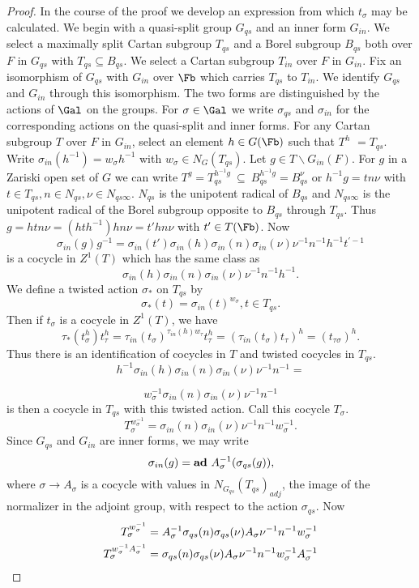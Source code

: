 \documentclass{memo-l}
\theoremstyle{definition}
\theoremstyle{remark}
\numberwithin{section}{chapter}
\numberwithin{equation}{chapter}
\begin{document}
\begin{proof}     In the course of the proof we develop an expression
from which $t_{{\sigma}}$ may be calculated.
 We begin with a quasi-split group $G_{qs}$ and an inner form $G_{in}$.
 We select a maximally split Cartan subgroup $T_{qs}$ and a Borel subgroup
$B_{qs}$ both over $F$ in $G_{qs}$ with $T_{qs} {\subseteq} {B_{qs}}$.
 We select a Cartan subgroup $T_{in}$ over $F$ in $G_{in}$.
 Fix an isomorphism of $G_{qs}$ with $G_{in}$ over $\Fb$  which
carries $T_{qs}$ to $T_{in}$.
 We identify $G_{qs}$ and $G_{in}$ through this isomorphism.
 The two forms are distinguished by the actions of $\Gal$ on the
groups.
 For ${\sigma} \in \Gal$ we write ${\sigma}_{qs}$ and
${\sigma}_{in}$ for the corresponding actions on the quasi-split and inner
forms.
  For any Cartan subgroup $T$ over $F$ in $G_{in}$, select an element $h \in
G(\Fb)$ such that $T^{h}$
$= T_{qs}$.
 Write ${\sigma}_{in}(h^{-1}) = w_{{\sigma}}h^{-1}$ with $w_{{\sigma}} \in
N_{G}(T_{qs})$.
 Let $g \in T\backslash G_{in}(F)$.
 For $g$ in a Zariski open set of $G$ we can write $T^g
= T_{qs}^{h^{-1}g}\ {\subseteq}\ B_{qs}^{h^{-1}g}  =
B_{qs}^\nu$  or $h^{-1}g = tn{\nu}$ with $t \in T_{qs},
n \in N_{qs}, {\nu} \in N_{qs{\infty}}$.
 $N_{qs}$ is the unipotent radical of $B_{qs}$ and $N_{qs{\infty}}$ is the
unipotent radical of the Borel subgroup opposite to $B_{qs}$ through $T_{qs}$.
 Thus $g = htn{\nu} = (hth^{-1})hn{\nu} = t'hn{\nu}$ with $t' \in
T(\Fb)$.
 Now
$$
\sigma_{in}(g)g^{-1} = {\sigma}_{in}(t'){\sigma}_{in}(h){\sigma}_{in}(n)
{\sigma}_{in}({\nu}){\nu}^{-1}n^{-1}h^{-1}t^{\prime-1}
$$
is a cocycle in $Z^{1}(T)$ which has the same class as
$$
{\sigma}_{in}(h){\sigma}_{in}(n){\sigma}_{in}({\nu}){\nu}^{-1}n^{-1}h^{-1} .
$$
We define a twisted action ${\sigma}_{*}$ on $T_{qs}$ by
$$
{\sigma}_{*}(t) = {\sigma}_{in}(t)^{w_{{\sigma}}}, t \in T_{qs} .
$$
Then if $t_{{\sigma}}$ is a cocycle in $Z^1(T)$, we have
$$
\tau_{*}(t_{{\sigma}}^{h})t_{{\tau}}^{h} =
{\tau}_{in}(t_{{\sigma}})^{\tau_{in}(h)w_{\tau}} t_{{\tau}}^{h} =
({\tau}_{in}(t_{{\sigma}})t_{{\tau}})^{h} = (t_{{\tau}{\sigma}})^{h}.
$$
Thus there is an identification of cocycles in $T$ and twisted cocycles in
$T_{qs}$.
$$
h^{-1}{\sigma}_{in}(h){\sigma}_{in}(n){\sigma}_{in}({\nu}){\nu}^{-1}n^{-1} =
$$

$$
w_{{\sigma}}^{-1}{\sigma}_{in}(n){\sigma}_{in}({\nu}){\nu}^{-1}n^{-1}
$$
is then a cocycle in $T_{qs}$ with this twisted action.
 Call this cocycle $T_{{\sigma}}$.
$$
T_{{\sigma}}^{w_\sigma^{-1}} =
{\sigma}_{in}(n){\sigma}_{in}({\nu}){\nu}^{-1}n^{-1}w_{{\sigma}}^{-1}.
$$
Since $G_{qs}$ and $G_{in}$ are inner forms, we may write
$$
{\sigma}_{in}(g) = {\bold {ad}}\ A_{{\sigma}}^{-1}({\sigma}_{qs}(g)),
$$
where ${\sigma} {\to} A_{{\sigma}}$ is a cocycle
with values in $N_{G_{qs}}(T_{qs})_{adj}$, the image of the normalizer
in the adjoint group,
with respect to the action ${\sigma}_{qs}$.
Now
$$
\aligned
T_{{\sigma}}^{w_\sigma^{-1}} &= A_{{\sigma}}^{-1}{\sigma}_{qs}(n)
{\sigma}_{qs}({\nu})A_{{\sigma}}{\nu}^{-1}n^{-1}w_{{\sigma}}^{-1} \\
T_\sigma^{w_\sigma^{-1}A_\sigma^{-1}} & = {\sigma}_{qs}(n)
{\sigma}_{qs}({\nu})A_{{\sigma}}{\nu}^{-1}n^{-1}w_{{\sigma}}^{-1}
A_{{\sigma}}^{-1}
\endaligned
$$


\end{proof}
\end{document}
